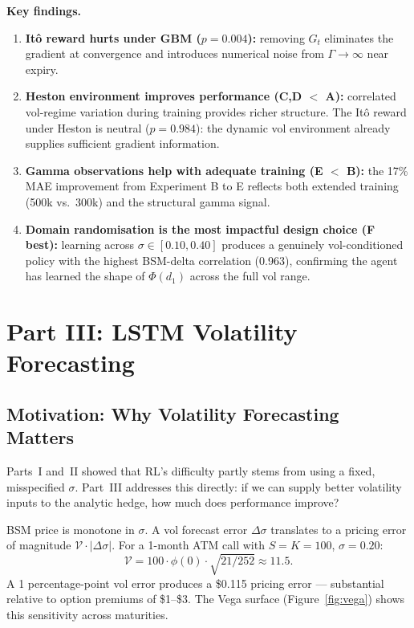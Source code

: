 \documentclass[12pt,a4paper]{article}
\begin{document}
\textbf{Key findings.}
\begin{enumerate}[leftmargin=*]
  \item \textbf{It\^{o} reward hurts under GBM ($p=0.004$):} removing
        $G_t$ eliminates the gradient at convergence and introduces numerical
        noise from $\Gamma\to\infty$ near expiry.

  \item \textbf{Heston environment improves performance (C,D $<$ A):}
        correlated vol-regime variation during training provides richer
        structure.  The Itô reward under Heston is neutral ($p=0.984$):
        the dynamic vol environment already supplies sufficient gradient
        information.

  \item \textbf{Gamma observations help with adequate training (E $<$ B):}
        the 17\% MAE improvement from Experiment B to E reflects both extended
        training (500k vs.\ 300k) and the structural gamma signal.

  \item \textbf{Domain randomisation is the most impactful design choice (F
        best):} learning across $\sigma\in[0.10,0.40]$ produces a genuinely
        vol-conditioned policy with the highest BSM-delta correlation (0.963),
        confirming the agent has learned the shape of $\Phi(d_1)$ across the
        full vol range.
\end{enumerate}

\section{Part III: LSTM Volatility Forecasting}
\label{sec:p3}

\subsection{Motivation: Why Volatility Forecasting Matters}

Parts~I and~II showed that RL's difficulty partly stems from using a fixed,
misspecified $\sigma$.  Part~III addresses this directly: if we can supply better
volatility inputs to the analytic hedge, how much does performance improve?

BSM price is monotone in $\sigma$.  A vol forecast error $\Delta\sigma$
translates to a pricing error of magnitude $\mathcal{V}\cdot|\Delta\sigma|$.
For a 1-month ATM call with $S=K=100$, $\sigma=0.20$:
\begin{equation}
  \mathcal{V} = 100\cdot\phi(0)\cdot\sqrt{21/252} \approx 11.5.
\end{equation}
A 1 percentage-point vol error produces a \$0.115 pricing error ---
substantial relative to option premiums of \$1--\$3.  The Vega surface
(Figure~\ref{fig:vega}) shows this sensitivity across maturities.
\end{document}
